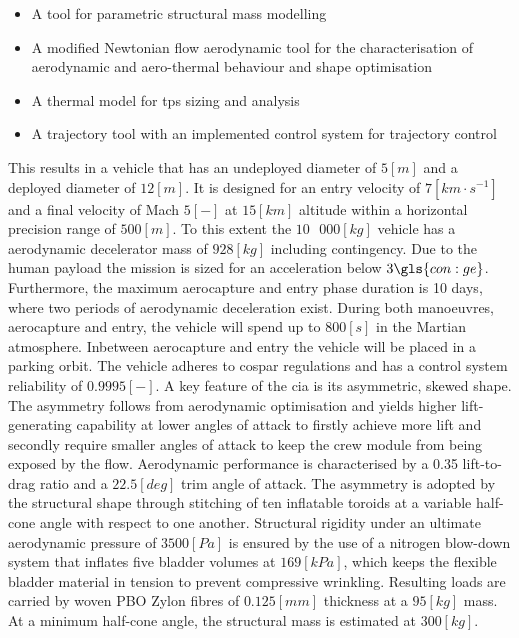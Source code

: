 \begin{itemize}
\item A tool for parametric structural mass modelling
\item A modified Newtonian flow aerodynamic tool for the characterisation of aerodynamic and aero-thermal behaviour and shape optimisation
\item A thermal model for \acrfull{tps} sizing and analysis
\item A trajectory tool with an implemented control system for trajectory control
\end{itemize}
\vspace{1mm}
This results in a vehicle that has an undeployed diameter of $5 \left[ m \right] $ and a deployed diameter of $12 \left[ m \right]$. It is designed for an entry velocity of $7 \left[ km \cdot s^{-1} \right]$ and a final velocity of Mach $5 \left[-\right]$ at  $15 \left[ km \right] $ altitude within a horizontal precision range of $500 \left[ m \right]$. To this extent the $10\mbox{ }000 \left[ kg \right]$ vehicle has a aerodynamic decelerator mass of $928 \left[ kg \right] $ including contingency. Due to the human payload the mission is sized for an acceleration below $3\gls{con:ge}$. Furthermore, the maximum aerocapture and entry phase duration is 10 days, where two periods of aerodynamic deceleration exist. During both manoeuvres, aerocapture and entry, the vehicle will spend up to $800 \left[ s \right]$ in the Martian atmosphere. Inbetween aerocapture and entry the vehicle will be placed in a parking orbit. The vehicle adheres to \acrshort{cospar} regulations and has a control system reliability of $0.9995 \left[ - \right] $.
\newline
\newline
A key feature of the \acrshort{cia} is its asymmetric, skewed shape. The asymmetry follows from aerodynamic optimisation and yields higher lift-generating capability at lower angles of attack to firstly achieve more lift and secondly require smaller angles of attack to keep the crew module from being exposed by the flow. Aerodynamic performance is characterised by a 0.35 lift-to-drag ratio and a $22.5\left[deg\right]$ trim angle of attack.
\newline
\newline
The asymmetry is adopted by the structural shape through stitching of ten inflatable toroids at a variable half-cone angle with respect to one another. Structural rigidity under an ultimate aerodynamic pressure of $3500 \left[Pa\right]$ is ensured by the use of a nitrogen blow-down system that inflates five bladder volumes at $169 \left[kPa\right]$, which keeps the flexible bladder material in tension to prevent compressive wrinkling. Resulting loads are carried by woven PBO Zylon\textsuperscript{\textregistered} fibres of $0.125 \left[mm\right]$ thickness at a $95 \left[kg\right]$ mass. At a minimum half-cone angle, the structural mass is estimated at $300 \left[kg\right]$. 
